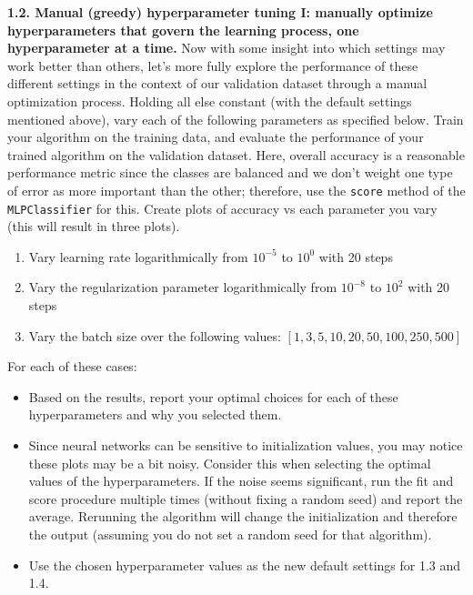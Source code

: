 \documentclass[
  letterpaper,
  DIV=11,
  numbers=noendperiod]{scrartcl}
\providecommand{\tightlist}{%
  \setlength{\itemsep}{0pt}\setlength{\parskip}{0pt}}\usepackage{longtable,booktabs,array}
\begin{document}
\textbf{1.2. Manual (greedy) hyperparameter tuning I: manually optimize
hyperparameters that govern the learning process, one hyperparameter at
a time.} Now with some insight into which settings may work better than
others, let's more fully explore the performance of these different
settings in the context of our validation dataset through a manual
optimization process. Holding all else constant (with the default
settings mentioned above), vary each of the following parameters as
specified below. Train your algorithm on the training data, and evaluate
the performance of your trained algorithm on the validation dataset.
Here, overall accuracy is a reasonable performance metric since the
classes are balanced and we don't weight one type of error as more
important than the other; therefore, use the \texttt{score} method of
the \texttt{MLPClassifier} for this. Create plots of accuracy vs each
parameter you vary (this will result in three plots).

\begin{enumerate}
\def\labelenumi{\arabic{enumi}.}
\tightlist
\item
  Vary learning rate logarithmically from \(10^{-5}\) to \(10^{0}\) with
  20 steps
\item
  Vary the regularization parameter logarithmically from \(10^{-8}\) to
  \(10^2\) with 20 steps
\item
  Vary the batch size over the following values:
  \([1,3,5,10,20,50,100,250,500]\)
\end{enumerate}

For each of these cases:

\begin{itemize}
\tightlist
\item
  Based on the results, report your optimal choices for each of these
  hyperparameters and why you selected them.
\item
  Since neural networks can be sensitive to initialization values, you
  may notice these plots may be a bit noisy. Consider this when
  selecting the optimal values of the hyperparameters. If the noise
  seems significant, run the fit and score procedure multiple times
  (without fixing a random seed) and report the average. Rerunning the
  algorithm will change the initialization and therefore the output
  (assuming you do not set a random seed for that algorithm).
\item
  Use the chosen hyperparameter values as the new default settings for
  1.3 and 1.4.
\end{itemize}
\end{document}
